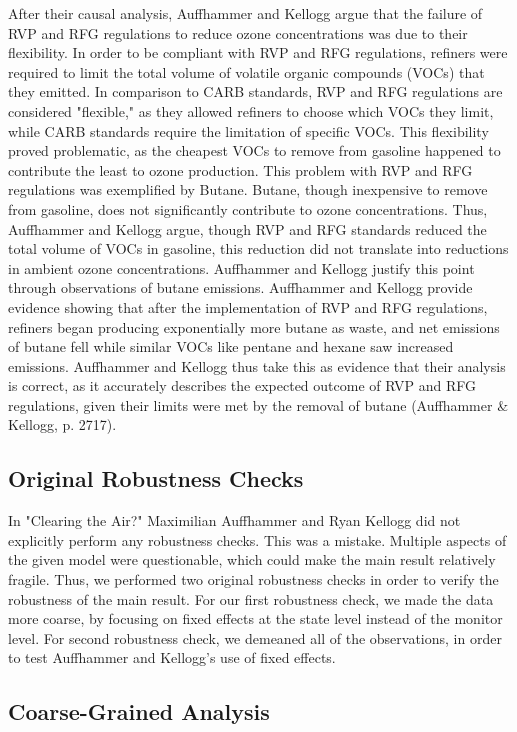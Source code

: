 \documentclass{article}
\begin{document}
After their causal analysis, Auffhammer and Kellogg argue that the failure of RVP and RFG regulations to reduce ozone concentrations was due to their flexibility. In order to be compliant with RVP and RFG regulations, refiners were required to limit the total volume of volatile organic compounds (VOCs) that they emitted. In comparison to CARB standards, RVP and RFG regulations are considered "flexible," as they allowed refiners to choose which VOCs they limit, while CARB standards require the limitation of specific VOCs. This flexibility proved problematic, as the cheapest VOCs to remove from gasoline happened to contribute the least to ozone production. This problem with RVP and RFG regulations was exemplified by Butane. Butane, though inexpensive to remove from gasoline, does not significantly contribute to ozone concentrations. Thus, Auffhammer and Kellogg argue, though RVP and RFG standards reduced the total volume of VOCs in gasoline, this reduction did not translate into reductions in ambient ozone concentrations. Auffhammer and Kellogg justify this point through observations of butane emissions. Auffhammer and Kellogg provide evidence showing that after the implementation of RVP and RFG regulations, refiners began producing exponentially more butane as waste, and net emissions of butane fell while similar VOCs like pentane and hexane saw increased emissions. Auffhammer and Kellogg thus take this as evidence that their analysis is correct, as it accurately describes the expected outcome of RVP and RFG regulations, given their limits were met by the removal of butane (Auffhammer \& Kellogg, p.  2717). 

\subsection{Original Robustness Checks}

In "Clearing the Air?" Maximilian Auffhammer and Ryan Kellogg did not explicitly perform any robustness checks. This was a mistake. Multiple aspects of the given model were questionable, which could make the main result relatively fragile. Thus, we performed two original robustness checks in order to verify the robustness of the main result. For our first robustness check, we made the data more coarse, by focusing on fixed effects at the state level instead of the monitor level. For second robustness check, we demeaned all of the observations, in order to test Auffhammer and Kellogg's use of fixed effects.

\subsection{Coarse-Grained Analysis}
\end{document}
